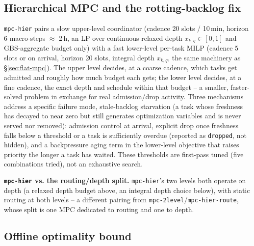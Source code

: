 \subsection{Hierarchical MPC and the rotting-backlog fix}
\label{sec:hier}

\texttt{mpc-hier} pairs a slow upper-level coordinator (cadence 20 slots / 10\,min, horizon 6 macro-steps $\approx$ 2\,h, an LP over continuous relaxed depth $x_{k,q} \in [0,1]$ and GBS-aggregate budget only) with a fast lower-level per-task MILP (cadence 5 slots or on arrival, horizon 20 slots, integral depth $x_{k,q}$, the same machinery as \S\ref{sec:flat-mpc}). The upper level decides, at a coarse cadence, which tasks get admitted and roughly how much budget each gets; the lower level decides, at a fine cadence, the exact depth and schedule within that budget -- a smaller, faster-solved problem in exchange for real admission/drop activity. Three mechanisms address a specific failure mode, stale-backlog starvation (a task whose freshness has decayed to near zero but still generates optimization variables and is never served nor removed): admission control at arrival, explicit drop once freshness falls below a threshold or a task is sufficiently overdue (reported as \texttt{dropped}, not hidden), and a backpressure aging term in the lower-level objective that raises priority the longer a task has waited. These thresholds are first-pass tuned (five combinations tried), not an exhaustive search.

\textbf{\texttt{mpc-hier} vs. the routing/depth split.} \texttt{mpc-hier}'s two levels both operate on depth (a relaxed depth budget above, an integral depth choice below), with static routing at both levels -- a different pairing from \texttt{mpc-2level}/\texttt{mpc-hier-route}, whose split is one MPC dedicated to routing and one to depth. 

\subsection{Offline optimality bound}

